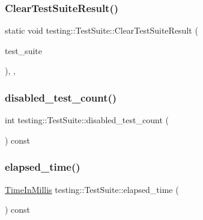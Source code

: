 \subsubsection{\texorpdfstring{Clear\+Test\+Suite\+Result()}{ClearTestSuiteResult()}}
{\footnotesize\ttfamily static void testing\+::\+Test\+Suite\+::\+Clear\+Test\+Suite\+Result (\begin{DoxyParamCaption}\item[{\hyperlink{classtesting_1_1TestSuite}{Test\+Suite} $\ast$}]{test\+\_\+suite }\end{DoxyParamCaption})\hspace{0.3cm}{\ttfamily [inline]}, {\ttfamily [static]}, {\ttfamily [private]}}

\mbox{\label{classtesting_1_1TestSuite_adba738351633471e3256dcf7d3c2e61e}} 
\subsubsection{\texorpdfstring{disabled\+\_\+test\+\_\+count()}{disabled\_test\_count()}}
{\footnotesize\ttfamily int testing\+::\+Test\+Suite\+::disabled\+\_\+test\+\_\+count (\begin{DoxyParamCaption}{ }\end{DoxyParamCaption}) const}

\mbox{\label{classtesting_1_1TestSuite_a2ede69fa37985ab8b21128955c56d6d7}} 
\subsubsection{\texorpdfstring{elapsed\+\_\+time()}{elapsed\_time()}}
{\footnotesize\ttfamily \hyperlink{namespacetesting_a992de1d091ce660f451d1e8b3ce30fd6}{Time\+In\+Millis} testing\+::\+Test\+Suite\+::elapsed\+\_\+time (\begin{DoxyParamCaption}{ }\end{DoxyParamCaption}) const\hspace{0.3cm}{\ttfamily [inline]}}

